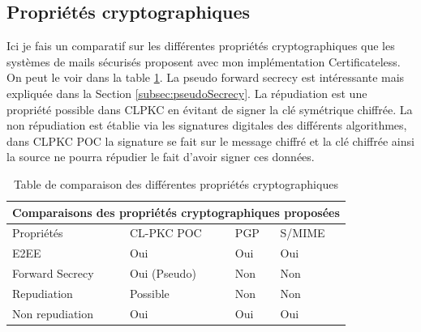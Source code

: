 \subsection{Propriétés cryptographiques}
Ici je fais un comparatif sur les différentes propriétés cryptographiques que les systèmes de mails sécurisés proposent avec mon implémentation Certificateless. On peut le voir dans la table \ref{table:comparisonProperties}. La pseudo forward secrecy est intéressante mais expliquée dans la Section \ref{subsec:pseudoSecrecy}. La répudiation est une propriété possible dans CLPKC en évitant de signer la clé symétrique chiffrée. La non répudiation est établie via les signatures digitales des différents algorithmes, dans CLPKC POC la signature se fait sur le message chiffré et la clé chiffrée ainsi la source ne pourra répudier le fait d'avoir signer ces données. 
\begin{table}[h!]
	\centering
	\begin{tabular}{ |p{3cm}||p{3cm}|p{3cm}|p{3cm}| }
		\hline
		\multicolumn{4}{|c|}{Comparaisons des propriétés cryptographiques proposées} \\
		\hline
		Propriétés & CL-PKC POC & PGP & S/MIME \\
		\hline
		E2EE   & Oui & Oui & Oui\\
		Forward Secrecy & Oui (Pseudo) & Non & Non\\
		Repudiation & Possible & Non & Non\\
		Non repudiation & Oui & Oui & Oui\\
		\hline
	\end{tabular}
	\caption{Table de comparaison des différentes propriétés cryptographiques }
	\label{table:comparisonProperties}
\end{table}
